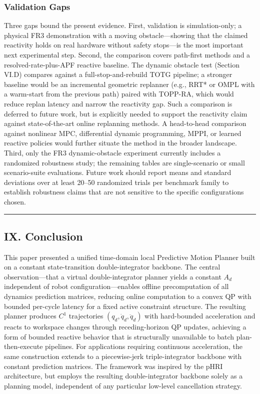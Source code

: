 \subsubsection{Validation Gaps}\label{validation-gaps}

Three gaps bound the present evidence. First, validation is
simulation-only; a physical FR3 demonstration with a moving
obstacle---showing that the claimed reactivity holds on real hardware
without safety stops---is the most important next experimental step.
Second, the comparison covers path-first methods and a
resolved-rate-plus-APF reactive baseline. The dynamic obstacle test
(Section VI.D) compares against a full-stop-and-rebuild TOTG pipeline; a
stronger baseline would be an incremental geometric replanner (e.g.,
RRT* or OMPL with a warm-start from the previous path) paired with
TOPP-RA, which would reduce replan latency and narrow the reactivity
gap. Such a comparison is deferred to future work, but is explicitly
needed to support the reactivity claim against state-of-the-art online
replanning methods. A head-to-head comparison against nonlinear MPC,
differential dynamic programming, MPPI, or learned reactive policies
would further situate the method in the broader landscape. Third, only
the FR3 dynamic-obstacle experiment currently includes a randomized
robustness study; the remaining tables are single-scenario or small
scenario-suite evaluations. Future work should report means and standard
deviations over at least 20--50 randomized trials per benchmark family
to establish robustness claims that are not sensitive to the specific
configurations chosen.

\begin{center}\rule{0.5\linewidth}{0.5pt}\end{center}

\subsection{IX. Conclusion}\label{ix.-conclusion}

This paper presented a unified time-domain local Predictive Motion
Planner built on a constant state-transition double-integrator backbone.
The central observation---that a virtual double-integrator planner
yields a constant \(A_d\) independent of robot configuration---enables
offline precomputation of all dynamics prediction matrices, reducing
online computation to a convex QP with bounded per-cycle latency for a
fixed active constraint structure. The resulting planner produces
\(C^1\) trajectories \((q_d, \dot{q}_d, \ddot{q}_d)\) with hard-bounded
acceleration and reacts to workspace changes through receding-horizon QP
updates, achieving a form of bounded reactive behavior that is
structurally unavailable to batch plan-then-execute pipelines. For
applications requiring continuous acceleration, the same construction
extends to a piecewise-jerk triple-integrator backbone with constant
prediction matrices. The framework was inspired by the pHRI
architecture, but employs the resulting double-integrator backbone
solely as a planning model, independent of any particular low-level
cancellation strategy.

